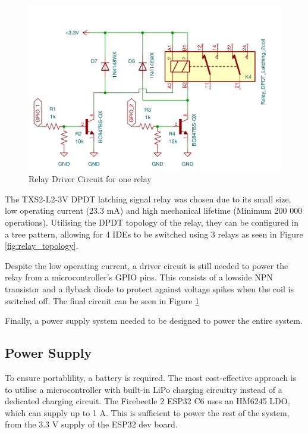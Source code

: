 \begin{figure}[H]
\begin{minipage}{0.6\textwidth}
        \centering
        \includegraphics[width=\textwidth]{RelayDriverSchem.png}
        \caption{Relay Driver Circuit for one relay}
        \label{fig:relay_circuit}
    \end{minipage}
\end{figure}
The TXS2-L2-3V DPDT latching signal relay was chosen due to its small size, low operating current (23.3 mA) and high mechanical lifetime (Minimum 200 000 operations). Utilising the DPDT topology of the relay, they can be configured in a tree pattern, allowing for 4 \acp{IDE} to be switched using 3 relays as seen in Figure \ref{fig:relay_topology}. 

Despite the low operating current, a driver circuit is still needed to power the relay from a microcontroller's \ac{GPIO} pins. This consists of a lowside NPN transistor and a flyback diode to protect against voltage spikes when the coil is switched off. The final circuit can be seen in Figure \ref{fig:relay_circuit}

Finally, a power supply system needed to be designed to power the entire system.
\subsection{Power Supply}
To ensure portablility, a battery is required. The most cost-effective approach is to utilise a microcontroller with built-in LiPo charging circuitry instead of a dedicated charging circuit. The Firebeetle 2 ESP32 C6 uses an HM6245 \ac{LDO}, which can supply up to 1 A. This is sufficient to power the rest of the system, from the 3.3 V supply of the ESP32 dev board.

